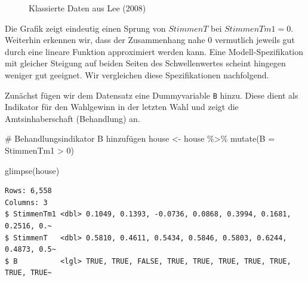 \documentclass[
  a4paper,
  DIV=11,
  oneside]{scrreprt}
\newenvironment{Shaded}{\begin{snugshade}}{\end{snugshade}}
\newcommand{\AttributeTok}[1]{\textcolor[rgb]{0.40,0.45,0.13}{#1}}
\newcommand{\CommentTok}[1]{\textcolor[rgb]{0.37,0.37,0.37}{#1}}
\newcommand{\DecValTok}[1]{\textcolor[rgb]{0.68,0.00,0.00}{#1}}
\newcommand{\FunctionTok}[1]{\textcolor[rgb]{0.28,0.35,0.67}{#1}}
\newcommand{\NormalTok}[1]{\textcolor[rgb]{0.00,0.23,0.31}{#1}}
\newcommand{\OtherTok}[1]{\textcolor[rgb]{0.00,0.23,0.31}{#1}}
\newcommand{\SpecialCharTok}[1]{\textcolor[rgb]{0.37,0.37,0.37}{#1}}
\begin{document}
\begin{figure}[t]


\caption{\label{fig-LeeDataClass}Klassierte Daten aus Lee (2008)}

\end{figure}%

Die Grafik zeigt eindeutig einen Sprung von \(StimmenT\) bei
\(StimmenTm1 = 0\). Weiterhin erkennen wir, dass der Zusammenhang nahe
\(0\) vermutlich jeweils gut durch eine lineare Funktion approximiert
werden kann. Eine Modell-Spezifikation mit gleicher Steigung auf beiden
Seiten des Schwellenwertes scheint hingegen weniger gut geeignet. Wir
vergleichen diese Spezifikationen nachfolgend.

Zunächst fügen wir dem Datensatz eine Dummyvariable \texttt{B} hinzu.
Diese dient als Indikator für den Wahlgewinn in der letzten Wahl und
zeigt die Amtsinhaberschaft (Behandlung) an.

\begin{Shaded}
\begin{Highlighting}[]
\CommentTok{\# Behandlungsindikator B hinzufügen}
\NormalTok{house }\OtherTok{\textless{}{-}}\NormalTok{ house }\SpecialCharTok{\%\textgreater{}\%} 
  \FunctionTok{mutate}\NormalTok{(}\AttributeTok{B =}\NormalTok{ StimmenTm1 }\SpecialCharTok{\textgreater{}} \DecValTok{0}\NormalTok{)}

\FunctionTok{glimpse}\NormalTok{(house)}
\end{Highlighting}
\end{Shaded}

\begin{verbatim}
Rows: 6,558
Columns: 3
$ StimmenTm1 <dbl> 0.1049, 0.1393, -0.0736, 0.0868, 0.3994, 0.1681, 0.2516, 0.~
$ StimmenT   <dbl> 0.5810, 0.4611, 0.5434, 0.5846, 0.5803, 0.6244, 0.4873, 0.5~
$ B          <lgl> TRUE, TRUE, FALSE, TRUE, TRUE, TRUE, TRUE, TRUE, TRUE, TRUE~
\end{verbatim}
\end{document}
